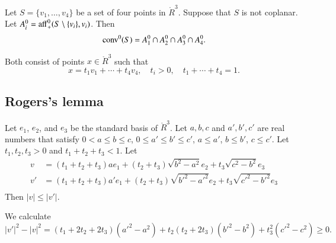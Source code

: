 \begin{tarskidata}
\begin{tarski}

\begin{lemma}
Let $S=\{v_1,\ldots, v_4\}$ be a set of four points
in $\ring{R}^3$.  Suppose that $S$ is not coplanar.
Let $A^0_i = {\operatorname{aff}}^0_+(S\setminus\{v_i\},v_i)$.
Then $${\operatorname{conv}}^0(S)  = A^0_1 \cap A^0_2 \cap A^0_3 \cap A^0_4.$$
\end{lemma}

\begin{proved}  Both consist of points $x\in\ring{R}^3$ such that
  $$x = t_1 v_1 +\cdots+ t_4 v_4,\quad t_i> 0,\quad t_1+\cdots +t_4 =1.
  $$
\swallowed\end{proved}
\end{tarski}






\begin{tarski}
\section{Rogers's lemma}

\begin{lemma}
Let $e_1$, $e_2$, and $e_3$ be the standard basis of
$\ring{R}^3$.  Let  $a,b,c$ and $a',b',c'$
are real numbers that satisfy $0 <a \le b \le c$, $0 \le a'\le b'\le c'$,
$a \le a'$, $b \le b'$, $c \le c'$. 
Let $t_1,t_2,t_3>0$ and $t_1+t_2+t_3< 1$.  Let
   $$
   \begin{array}{lll}
   v &= (t_1+t_2+t_3) a e_1 + (t_2+t_3) \sqrt{b^2-a^2} e_2 + t_3
   \sqrt{c^2-b^2} e_3\\
   v' &= (t_1+t_2+t_3) a' e_1 + (t_2+t_3) \sqrt{b'^2-a'^2} e_2 + t_3
   \sqrt{c'^2-b'^2} e_3\\
    \end{array}
    $$
    Then $|v| \le |v'|$.
\end{lemma}

\begin{proved}
  We calculate
  $$
  |v'|^2-|v|^2 = (t_1+2t_2+2t_3)(a'^2-a^2) + t_2 (t_2+2t_3)(b'^2-b^2)
    +t_3^2 (c'^2-c^2)\ge0.
  $$
\swallowed\end{proved}
\end{tarski}







\end{tarskidata}
